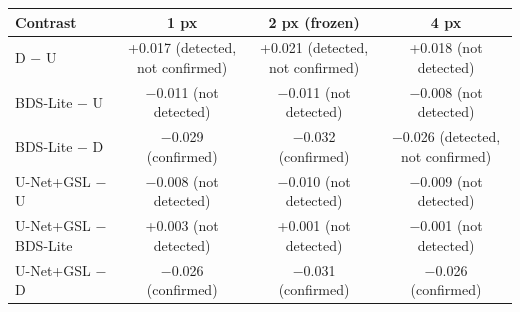\begin{tabular}{lccc}
\toprule
Contrast & 1 px & 2 px (frozen) & 4 px \\
\midrule
D $-$ U & +0.017 (detected, not confirmed) & +0.021 (detected, not confirmed) & +0.018 (not detected) \\
BDS-Lite $-$ U & $-$0.011 (not detected) & $-$0.011 (not detected) & $-$0.008 (not detected) \\
BDS-Lite $-$ D & $-$0.029 (confirmed) & $-$0.032 (confirmed) & $-$0.026 (detected, not confirmed) \\
U-Net+GSL $-$ U & $-$0.008 (not detected) & $-$0.010 (not detected) & $-$0.009 (not detected) \\
U-Net+GSL $-$ BDS-Lite & +0.003 (not detected) & +0.001 (not detected) & $-$0.001 (not detected) \\
U-Net+GSL $-$ D & $-$0.026 (confirmed) & $-$0.031 (confirmed) & $-$0.026 (confirmed) \\
\bottomrule
\end{tabular}
